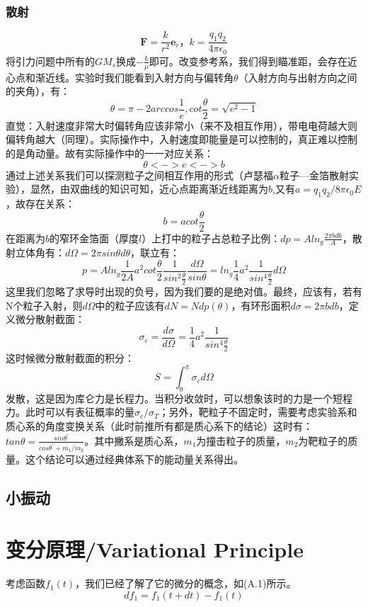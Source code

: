 \documentclass[a4paper, 10pt, openany]{book}%
\begin{document}
    \subsection{散射}
    $$\textbf{F}=\frac{k}{r^2}\textbf{e}_r，k=\frac{q_1q_2}{4\pi\epsilon_0}$$
    将引力问题中所有的$GM_s$换成$-\frac{k}{\mu}$即可。改变参考系，我们得到瞄准距，会存在近心点和渐近线。实验时我们能看到入射方向与偏转角$\theta$（入射方向与出射方向之间的夹角），有：
    $$\theta=\pi-2arccos\frac{1}{e},cot\frac{\theta}{2}=\sqrt{e^2-1}$$
    直觉：入射速度非常大时偏转角应该非常小（来不及相互作用），带电电荷越大则偏转角越大（同理）。实际操作中，入射速度即能量是可以控制的，真正难以控制的是角动量。故有实际操作中的一一对应关系：
    $$\theta<->e<->b$$
    通过上述关系我们可以探测粒子之间相互作用的形式（卢瑟福$\alpha$粒子—金箔散射实验），显然，由双曲线的知识可知，近心点距离渐近线距离为$b$,又有$a=q_1q_2/8\pi\epsilon_0E$，故存在关系：
    $$b=acot\frac{\theta}{2}$$
    在距离为$b$的窄环金箔面（厚度$l$）上打中的粒子占总粒子比例：$dp=Aln_g\frac{2\pi bdb}{A}$，散射立体角有：$d\Omega=2\pi sin\theta d\theta$，联立有：
    $$p=Aln_g\frac{1}{2A}a^2cot\frac{\theta}{2}\frac{1}{sin^2\frac{\theta}{2}}\frac{d\Omega}{ sin\theta}=ln_g\frac{1}{4}a^2\frac{1}{sin^4\frac{\theta}{2}}{d\Omega}$$
    这里我们忽略了求导时出现的负号，因为我们要的是绝对值。最终，应该有，若有N个粒子入射，则$d\Omega$中的粒子应该有$dN=Ndp(\theta)$，有环形面积$d\sigma=2\pi bdb$，定义微分散射截面：
    $$\sigma_c=\frac{d\sigma}{d\Omega}=\frac{1}{4}a^2\frac{1}{sin^4\frac{\theta}{2}}$$
    这时候微分散射截面的积分：
    $$S=\int_0^\pi\sigma_cd\Omega$$
    发散，这是因为库仑力是长程力。当积分收敛时，可以想象该时的力是一个短程力。此时可以有表征概率的量$\sigma_c/\sigma_T$；另外，靶粒子不固定时，需要考虑实验系和质心系的角度变换关系（此时前推所有都是质心系下的结论）这时有：$tan\theta=\frac{sin\theta^\prime}{cos\theta^\prime+m_1/m_2}$。其中撇系是质心系，$m_1$为撞击粒子的质量，$m_2$为靶粒子的质量。这个结论可以通过经典体系下的能动量关系得出。

\section{小振动}




\newpage

\appendix
\chapter{变分原理/Variational Principle}

\label{appendix A}
考虑函数$f_1(t)$，我们已经了解了它的微分的概念，如(A.1)所示。
\begin{equation}
  df_1=f_1(t+dt)-f_1(t)
\end{equation}
\end{document}
